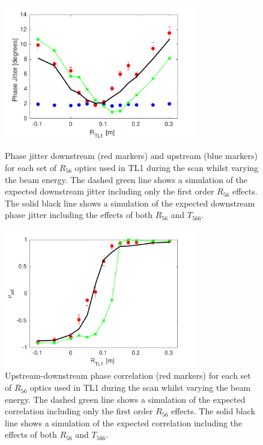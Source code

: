 \begin{figure}
  \centering
  \includegraphics[width=0.75\textwidth]{Figures/propagation/R56ScanGunWiggle_PhaseJitter}
  \caption{Phase jitter downstream (red markers) and upstream (blue markers) for each set of \(R_{56}\) optics used in TL1 during the scan whilst varying the beam energy. The dashed green line shows a simulation of the expected downstream jitter including only the first order \(R_{56}\) effects. The solid black line shows a simulation of the expected downstream phase jitter including the effects of both \(R_{56}\) and \(T_{566}\).}
  \label{f:R56ScanGunWiggle_PhaseJitter}
  \includegraphics[width=0.75\textwidth]{Figures/propagation/R56ScanGunWiggle_Correl}
  \caption{Upstream-downstream phase correlation (red markers) for each set of \(R_{56}\) optics used in TL1 during the scan whilst varying the beam energy. The dashed green line shows a simulation of the expected correlation including only the first order \(R_{56}\) effects. The solid black line shows a simulation of the expected correlation including the effects of both \(R_{56}\) and \(T_{566}\).}
  \label{f:R56ScanGunWiggle_Correl}
\end{figure}

